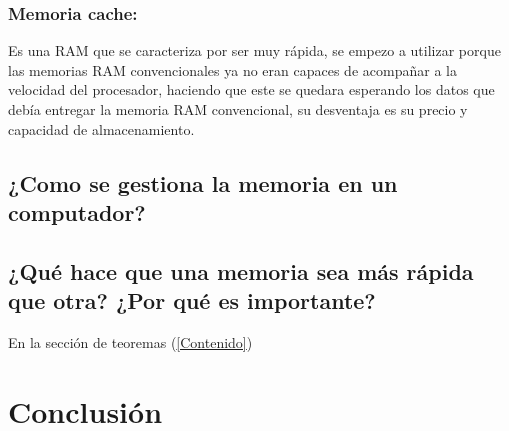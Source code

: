 \documentclass{article}
\begin{document}
\subsubsection{Memoria cache:}
Es una RAM que se caracteriza por ser muy rápida, se empezo a utilizar porque las memorias RAM convencionales ya no eran capaces de acompañar a la velocidad del procesador, haciendo que este se quedara esperando los datos que debía entregar la memoria RAM convencional, su desventaja es su precio y capacidad de almacenamiento.



\subsection{¿Como se gestiona la memoria en un computador?}
\subsection{¿Qué hace que una memoria sea más rápida que otra? ¿Por qué es importante?}

En la sección de teoremas (\ref{Contenido})

\section{Conclusión} \label{Conclusión}



\end{document}
